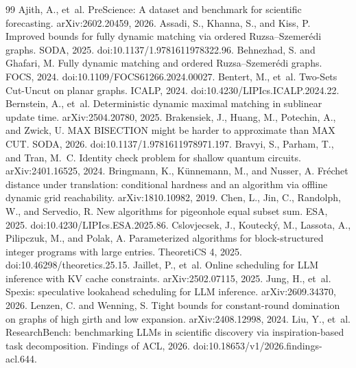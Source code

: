 \documentclass[11pt]{article}
\begin{document}

\begin{thebibliography}{99}
 Ajith, A., et~al. PreScience: A dataset and benchmark for scientific forecasting. arXiv:2602.20459, 2026.
 Assadi, S., Khanna, S., and Kiss, P. Improved bounds for fully dynamic matching via ordered Ruzsa--Szemer\'edi graphs. SODA, 2025. doi:10.1137/1.9781611978322.96.
 Behnezhad, S. and Ghafari, M. Fully dynamic matching and ordered Ruzsa--Szemer\'edi graphs. FOCS, 2024. doi:10.1109/FOCS61266.2024.00027.
 Bentert, M., et~al. Two-Sets Cut-Uncut on planar graphs. ICALP, 2024. doi:10.4230/LIPIcs.ICALP.2024.22.
 Bernstein, A., et~al. Deterministic dynamic maximal matching in sublinear update time. arXiv:2504.20780, 2025.
 Brakensiek, J., Huang, M., Potechin, A., and Zwick, U. MAX BISECTION might be harder to approximate than MAX CUT. SODA, 2026. doi:10.1137/1.9781611978971.197.
 Bravyi, S., Parham, T., and Tran, M.~C. Identity check problem for shallow quantum circuits. arXiv:2401.16525, 2024.
 Bringmann, K., K\"unnemann, M., and Nusser, A. Fr\'echet distance under translation: conditional hardness and an algorithm via offline dynamic grid reachability. arXiv:1810.10982, 2019.
 Chen, L., Jin, C., Randolph, W., and Servedio, R. New algorithms for pigeonhole equal subset sum. ESA, 2025. doi:10.4230/LIPIcs.ESA.2025.86.
 Cslovjecsek, J., Kouteck\'y, M., Lassota, A., Pilipczuk, M., and Polak, A. Parameterized algorithms for block-structured integer programs with large entries. TheoretiCS 4, 2025. doi:10.46298/theoretics.25.15.
 Jaillet, P., et~al. Online scheduling for LLM inference with KV cache constraints. arXiv:2502.07115, 2025.
 Jung, H., et~al. Spexis: speculative lookahead scheduling for LLM inference. arXiv:2609.34370, 2026.
 Lenzen, C. and Wenning, S. Tight bounds for constant-round domination on graphs of high girth and low expansion. arXiv:2408.12998, 2024.
 Liu, Y., et~al. ResearchBench: benchmarking LLMs in scientific discovery via inspiration-based task decomposition. Findings of ACL, 2026. doi:10.18653/v1/2026.findings-acl.644.

\end{thebibliography}
\end{document}
